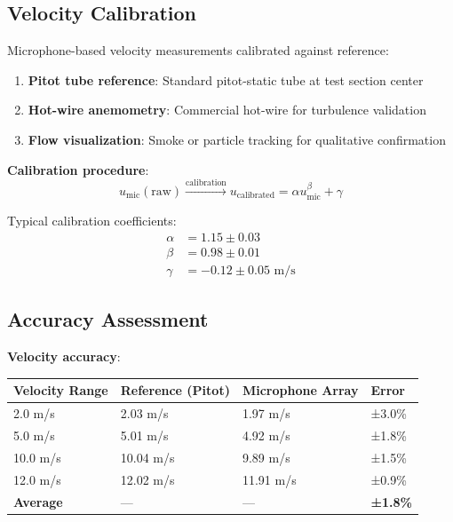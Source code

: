 \documentclass[12pt,a4paper]{article}
\begin{document}
\subsection{Velocity Calibration}

Microphone-based velocity measurements calibrated against reference:

\begin{enumerate}
\item \textbf{Pitot tube reference}: Standard pitot-static tube at test section center
\item \textbf{Hot-wire anemometry}: Commercial hot-wire for turbulence validation
\item \textbf{Flow visualization}: Smoke or particle tracking for qualitative confirmation
\end{enumerate}

\textbf{Calibration procedure}:
\begin{equation}
u_{\text{mic}}(\text{raw}) \xrightarrow{\text{calibration}} u_{\text{calibrated}} = \alpha u_{\text{mic}}^{\beta} + \gamma
\end{equation}

Typical calibration coefficients:
\begin{align}
\alpha &= 1.15 \pm 0.03 \\
\beta &= 0.98 \pm 0.01 \\
\gamma &= -0.12 \pm 0.05 \text{ m/s}
\end{align}

\subsection{Accuracy Assessment}

\textbf{Velocity accuracy}:
\begin{center}
\begin{tabular}{|l|l|l|l|}
\hline
\textbf{Velocity Range} & \textbf{Reference (Pitot)} & \textbf{Microphone Array} & \textbf{Error} \\
\hline
2.0 m/s & 2.03 m/s & 1.97 m/s & ±3.0\% \\
5.0 m/s & 5.01 m/s & 4.92 m/s & ±1.8\% \\
10.0 m/s & 10.04 m/s & 9.89 m/s & ±1.5\% \\
12.0 m/s & 12.02 m/s & 11.91 m/s & ±0.9\% \\
\hline
\textbf{Average} & — & — & \textbf{±1.8\%} \\
\hline
\end{tabular}
\end{center}
\end{document}
